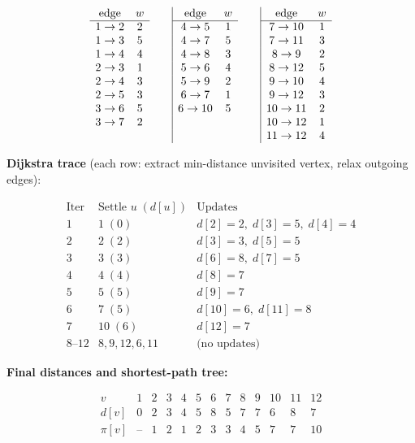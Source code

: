 \documentclass[11pt]{article}
\begin{document}
\vspace{-10pt}
{\small\[
\begin{array}{cccc|cccc|cccc}
\text{edge} & w && & \text{edge} & w && & \text{edge} & w \\
\cline{1-2} \cline{5-6} \cline{9-10}
1 \to 2 & 2 && & 4 \to 5 & 1 && & 7 \to 10 & 1 \\
1 \to 3 & 5 && & 4 \to 7 & 5 && & 7 \to 11 & 3 \\
1 \to 4 & 4 && & 4 \to 8 & 3 && & 8 \to 9 & 2 \\
2 \to 3 & 1 && & 5 \to 6 & 4 && & 8 \to 12 & 5 \\
2 \to 4 & 3 && & 5 \to 9 & 2 && & 9 \to 10 & 4 \\
2 \to 5 & 3 && & 6 \to 7 & 1 && & 9 \to 12 & 3 \\
3 \to 6 & 5 && & 6 \to 10 & 5 && & 10 \to 11 & 2 \\
3 \to 7 & 2 && & & && & 10 \to 12 & 1 \\
 & && & & && & 11 \to 12 & 4
\end{array}
\]}

\textbf{Dijkstra trace} (each row: extract min-distance unvisited vertex, relax outgoing edges):

{\small\[
\begin{array}{c|l|l}
\text{Iter} & \text{Settle } u\;(d[u]) & \text{Updates} \\ \hline
1 & 1\;(0) & d[2]{=}2,\; d[3]{=}5,\; d[4]{=}4 \\
2 & 2\;(2) & d[3]{=}3,\; d[5]{=}5 \\
3 & 3\;(3) & d[6]{=}8,\; d[7]{=}5 \\
4 & 4\;(4) & d[8]{=}7 \\
5 & 5\;(5) & d[9]{=}7 \\
6 & 7\;(5) & d[10]{=}6,\; d[11]{=}8 \\
7 & 10\;(6) & d[12]{=}7 \\
8\text{--}12 & 8,9,12,6,11 & \text{(no updates)}
\end{array}
\]}

\textbf{Final distances and shortest-path tree:}

\[
\begin{array}{c|cccccccccccc}
v & 1 & 2 & 3 & 4 & 5 & 6 & 7 & 8 & 9 & 10 & 11 & 12 \\ \hline
d[v] & 0 & 2 & 3 & 4 & 5 & 8 & 5 & 7 & 7 & 6 & 8 & 7 \\
\pi[v] & \text{--} & 1 & 2 & 1 & 2 & 3 & 3 & 4 & 5 & 7 & 7 & 10
\end{array}
\]
\end{document}
